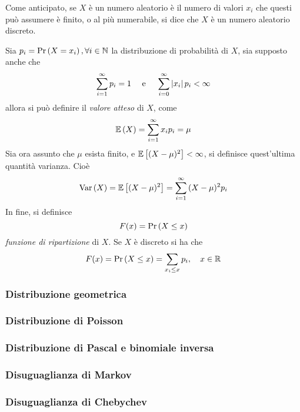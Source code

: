 \documentclass{subfiles}
\begin{document}
Come anticipato, se \(X\) è un numero aleatorio è il numero di valori \(x_{i}\) che questi può assumere è finito, o al più numerabile,
si dice che \(X\) è un numero aleatorio discreto.

Sia \(p_{i} = \Prob{X = x_{i}}, \forall i \in \Natural\) la distribuzione di probabilità di \(X\), sia supposto anche che
\[
    \Sum{p_i}{i = 1}[\infty] = 1 \quad \text{e} \quad \Sum{\Abs{x_{i}} p_i}{i = 0}[\infty] < \infty
\]
allora si può definire il \emph{valore atteso} di \(X\), come
\[
    \Expected{X} = \Sum{x_{i} p_{i}}{i = 1}[\infty] = \mu
\]
Sia ora assunto che \(\mu\) esista finito, e \(\Expected*{(X - \mu)^{2}} < \infty\), si definisce quest'ultima quantità varianza.
Cioè
\[
    \Var{X} = \Expected*{(X - \mu)^{2}} = \Sum{(X - \mu)^{2} p_{i}}{i = 1}[\infty]
\]
In fine, si definisce
\[
    F(x) = \Prob{X \le x}
\]
\emph{funzione di ripartizione} di \(X\). Se \(X\) è discreto si ha che
\[
    F(x) = \Prob{X \le x} = \Sum{p_{i}}{x_{i} \le x}, \quad x \in \Real
\]

\subsubsection{Distribuzione geometrica}


\subsubsection{Distribuzione di Poisson}


\subsubsection{Distribuzione di Pascal e binomiale inversa}


\subsubsection{Disuguaglianza di Markov}


\subsubsection{Disuguaglianza di Chebychev}

\end{document}
